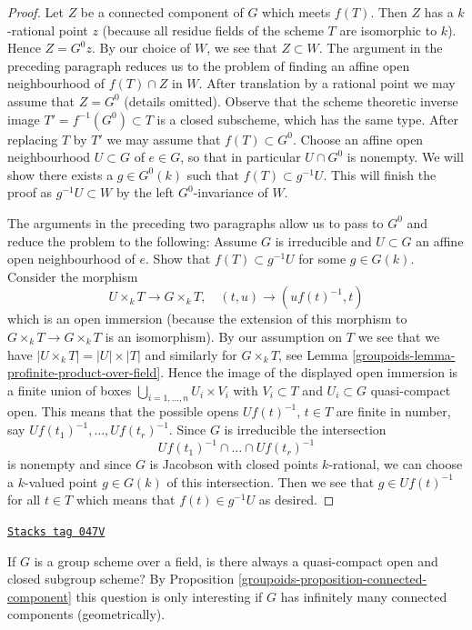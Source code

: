 \begin{proof}
\medskip\noindent
Let $Z$ be a connected component of $G$ which meets $f(T)$. Then $Z$
has a $k$-rational point $z$ (because all residue fields of the scheme $T$
are isomorphic to $k$). Hence $Z = G^0 z$. By our choice of $W$, we see
that $Z \subset W$. The argument in the preceding paragraph reduces us to
the problem of finding an affine open neighbourhood of $f(T) \cap Z$ in $W$.
After translation by a rational point we may assume that $Z = G^0$
(details omitted). Observe that the scheme theoretic inverse image
$T' = f^{-1}(G^0) \subset T$ is a closed subscheme, which has the same type.
After replacing $T$ by $T'$ we may assume that $f(T) \subset G^0$.
Choose an affine open neighbourhood $U \subset G$
of $e \in G$, so that in particular $U \cap G^0$ is nonempty. We will show
there exists a $g \in G^0(k)$ such that $f(T) \subset g^{-1}U$.
This will finish the proof as $g^{-1}U \subset W$ by the left
$G^0$-invariance of $W$.

\medskip\noindent
The arguments in the preceding two paragraphs allow us to pass to $G^0$
and reduce the problem to the following:
Assume $G$ is irreducible and $U \subset G$ an affine
open neighbourhood of $e$. Show that $f(T) \subset g^{-1}U$
for some $g \in G(k)$. Consider the morphism
$$
U \times_k T \longrightarrow G \times_k T,\quad
(t, u) \longrightarrow (uf(t)^{-1}, t)
$$
which is an open immersion (because the extension of this morphism to
$G \times_k T \to G \times_k T$ is an isomorphism).
By our assumption on $T$ we see that we have $|U \times_k T| = |U| \times |T|$
and similarly for $G \times_k T$, see
Lemma \ref{groupoids-lemma-profinite-product-over-field}.
Hence the image of the displayed open immersion is a finite union
of boxes $\bigcup_{i = 1, \ldots, n} U_i \times V_i$ with
$V_i \subset T$ and $U_i \subset G$ quasi-compact open. This means that
the possible opens $Uf(t)^{-1}$, $t \in T$ are finite in number, say
$Uf(t_1)^{-1}, \ldots, Uf(t_r)^{-1}$. Since $G$ is irreducible the
intersection
$$
Uf(t_1)^{-1} \cap \ldots \cap Uf(t_r)^{-1}
$$
is nonempty and since $G$ is Jacobson with closed points $k$-rational,
we can choose a $k$-valued point $g \in G(k)$ of this intersection.
Then we see that $g \in Uf(t)^{-1}$ for all $t \in T$ which
means that $f(t) \in g^{-1}U$ as desired.
\end{proof}

\begin{remark}[Easy]
\label{groupoids-remark-easy}
\href{https://stacks.math.columbia.edu/tag/047V}{\texttt{Stacks tag 047V}}

If $G$ is a group scheme over a field, is there always a quasi-compact
open and closed subgroup scheme? By
Proposition \ref{groupoids-proposition-connected-component}
this question is only interesting if $G$ has infinitely many connected
components (geometrically).
\end{remark}

